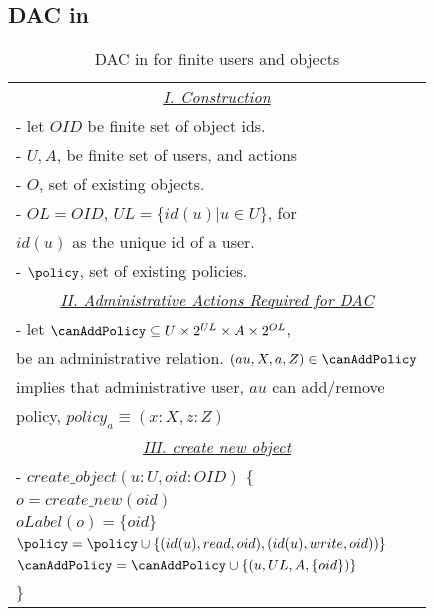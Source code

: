 \subsection{DAC in \clabac}

 
\begin{table*}
	\centering
	\caption{ DAC in \labacOneOneOne{} for finite users and objects} %
	\label{tab:dac-definition}
	\begin{tabular}{|l|}						
		\hline					
	 
		\multicolumn{1}{|c|}{\underline{\textit{I. Construction}}} \\
		- let $OID$ be finite set of object ids. \\
		-  $U, A$, be finite set of users, and actions\\
		- $O$, set of existing objects. \\
		-   $OL=OID$, $UL=\{ id(u) | u \in U \}$, for \\ \hfill $id(u)$ as the unique id of a user. \\
		- $\policy$, set of existing policies.\\
		\multicolumn{1}{|c|}{\underline{\textit{II. Administrative Actions Required for DAC}}} \\
			- let $\canAddPolicy \subseteq U \times 2^{UL} \times A \times 2^{OL}$, \\  \hfill be an administrative relation.  $(au, X, a, Z) \in \canAddPolicy$ \\  \hfill implies that  administrative user, $au$  can add/remove \\ \hfill  policy,  $policy_a \equiv (x:X,z:Z)$\\
		\multicolumn{1}{|c|}{\underline{\textit{III. create new object}}} \\
			- $create\_object(u:U, oid:OID)$ \{ \\
			\quad $o = create\_new(oid)$ \\
			\quad	$oLabel(o) = \{oid\}$\\
			\quad	$\policy = \policy \cup \{ ( id(u), read, oid), ( id(u), write, oid) )\}$ \\
			\quad   $\canAddPolicy = \canAddPolicy \cup \{(u, UL, A, \{oid \}) \}$ \\		
			\quad \} \\
			\hline
	\end{tabular}	
\end{table*}

